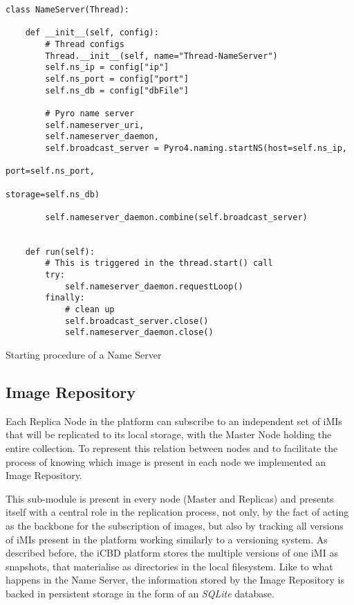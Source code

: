 \begin{listing}[h!]
\begin{verbatim}
class NameServer(Thread):

	def __init__(self, config):
		# Thread configs
        Thread.__init__(self, name="Thread-NameServer")
        self.ns_ip = config["ip"]
        self.ns_port = config["port"]
        self.ns_db = config["dbFile"]

        # Pyro name server
        self.nameserver_uri, 
        self.nameserver_daemon, 
        self.broadcast_server = Pyro4.naming.startNS(host=self.ns_ip,
                                                     port=self.ns_port,
                                                     storage=self.ns_db)

        self.nameserver_daemon.combine(self.broadcast_server)


	def run(self):
        # This is triggered in the thread.start() call
        try:
            self.nameserver_daemon.requestLoop()
        finally:
            # clean up
            self.broadcast_server.close()
            self.nameserver_daemon.close()
\end{verbatim}
\caption{Starting procedure of a Name Server}
\label{listing:icbd_nameserver}
\end{listing}



\subsection{Image Repository}
\label{sub:rep_image_repo}

Each Replica Node in the platform can subscribe to an independent set of iMIs that will be replicated to its local storage, with the Master Node holding the entire collection. 
To represent this relation between nodes and to facilitate the process of knowing which image is present in each node we implemented an Image Repository.

This sub-module is present in every node (Master and Replicas) and presents itself with a central role in the replication process, not only, by the fact of acting as the backbone for the subscription of images, but also by tracking all versions of iMIs present in the platform working similarly to a versioning system. As described before, the iCBD platform stores the multiple versions of one iMI as snapshots, that materialise as directories in the local filesystem. Like to what happens in the Name Server, the information stored by the Image Repository is backed in persistent storage in the form of an \textit{SQLite} database. 

